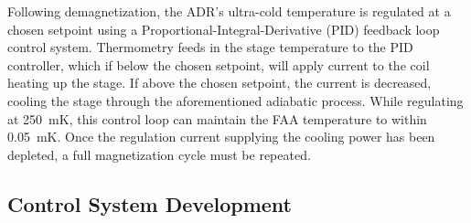\documentclass[iop]{emulateapj}
\begin{document}
Following demagnetization, the ADR's ultra-cold temperature is regulated at a chosen setpoint using a Proportional-Integral-Derivative (PID) feedback loop control system.  Thermometry feeds in the stage temperature to the PID controller, which if below the chosen setpoint, will apply current to the coil heating up the stage.  If above the chosen setpoint, the current is decreased, cooling the stage through the aforementioned adiabatic process.  While regulating at 250~mK, this control loop can maintain the FAA temperature to within 0.05~mK.  Once the regulation current supplying the cooling power has been depleted, a full magnetization cycle must be repeated.





\subsection{Control System Development}
\end{document}
